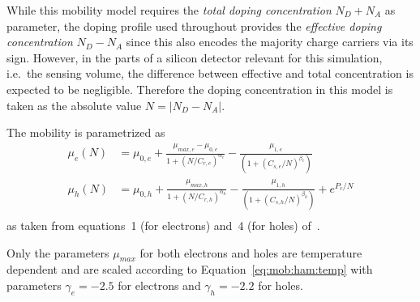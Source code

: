 While this mobility model requires the \emph{total doping concentration} $N_D + N_A$ as parameter, the doping profile used throughout \apsq provides the \emph{effective doping concentration} $N_D - N_A$ since this also encodes the majority charge carriers via its sign.
However, in the parts of a silicon detector relevant for this simulation, i.e.\ the sensing volume, the difference between effective and total concentration is expected to be negligible.
Therefore the doping concentration in this model is taken as the absolute value $N = \left|N_D - N_A\right|$.

The mobility is parametrized as
\begin{equation}
    \label{eq:mob:mas}
    \begin{split}
        \mu_e(N) &= \mu_{0,e} + \frac{\mu_{max,e} - \mu_{0,e}}{1 + (N / C_{r,e})^{\alpha_e}} - \frac{\mu_{1,e}}{(1 + (C_{s,e} / N)^{\beta_e})}\\
        \mu_h(N) &= \mu_{0,h} + \frac{\mu_{max,h}}{1 + (N / C_{r,h})^{\alpha_h}} - \frac{\mu_{1,h}}{(1 + (C_{s,h} / N)^{\beta_h})} + e^{P_c / N}\\
\end{split}
\end{equation}
as taken from equations~1 (for electrons) and~4 (for holes) of~\cite{masetti}.

Only the parameters $\mu_{max}$ for both electrons and holes are temperature dependent and are scaled according to Equation~\eqref{eq:mob:ham:temp} with parameters $\gamma_e = -2.5$ for electrons and $\gamma_h = -2.2$ for holes.

